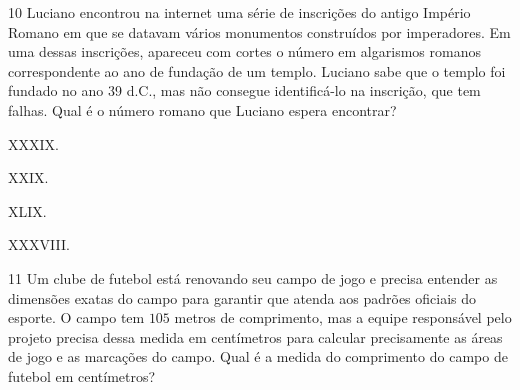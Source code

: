 
\num{10} Luciano encontrou na internet uma série de inscrições do antigo Império
Romano em que se datavam vários monumentos construídos por imperadores. Em uma
dessas inscrições, apareceu com cortes o número em algarismos romanos correspondente
ao ano de fundação de um templo. Luciano sabe que o templo foi fundado no ano 39 d.C.,
mas não consegue identificá-lo na inscrição, que tem falhas. Qual é o número romano
que Luciano espera encontrar?

\begin{escolha}
\item XXXIX.
\item XXIX.
\item XLIX.
\item XXXVIII.
\end{escolha}



\num{11} Um clube de futebol está renovando seu campo de jogo e
precisa entender as dimensões exatas do campo para garantir que
atenda aos padrões oficiais do esporte. O campo tem $105$ metros
de comprimento, mas a equipe responsável pelo projeto precisa
dessa medida em centímetros para calcular precisamente as áreas
de jogo e as marcações do campo. Qual é a medida do comprimento
do campo de futebol em centímetros?


